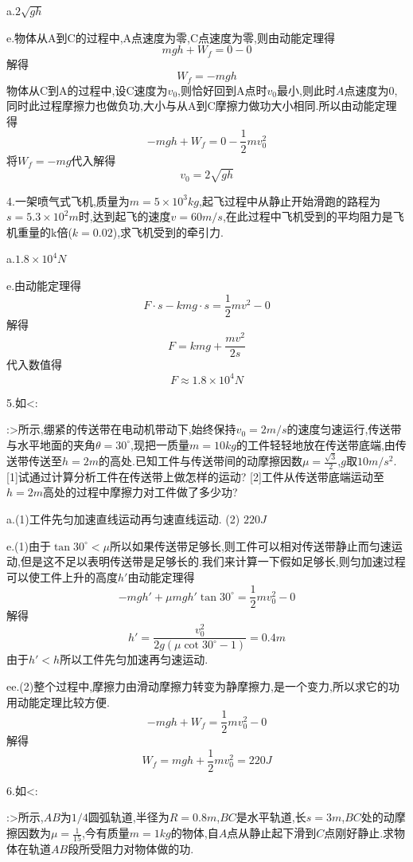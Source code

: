 \begin{calculate}
a.$2\sqrt{gh}$

e.物体从A到C的过程中,A点速度为零,C点速度为零,则由动能定理得
\[
  mgh+W_f=0-0
\]
解得
\[
  W_f=-mgh
\]
物体从C到A的过程中,设C速度为$v_0$,则恰好回到A点时$v_0$最小,则此时$A$点速度为0,同时此过程摩擦力也做负功,大小与从A到C摩擦力做功大小相同.所以由动能定理得
\[
  -mgh+W_f=0-\frac{1}{2}mv_0^2
\]
将$W_f=-mg$代入解得
\[
  v_0=2\sqrt{gh}
\]

4.一架喷气式飞机,质量为$m=5\times10^3kg$,起飞过程中从静止开始滑跑的路程为$s=5.3\times10^2m$时,达到起飞的速度$v=60m/s$,在此过程中飞机受到的平均阻力是飞机重量的k倍($k=0.02$),求飞机受到的牵引力.

a.$1.8\times10^4N$

e.由动能定理得
\[
  F\cdot s-kmg\cdot s=\frac{1}{2}mv^2-0
\]
解得
\[
  F=kmg+\frac{mv^2}{2s}
\]
代入数值得
\[
  F\approx1.8\times10^4N
\]

5.如<:
:>所示,绷紧的传送带在电动机带动下,始终保持$v_0=2m/s$的速度匀速运行,传送带与水平地面的夹角$\theta=30^\circ$,现把一质量$m=10kg$的工件轻轻地放在传送带底端,由传送带传送至$h=2m$的高处.已知工件与传送带间的动摩擦因数$\mu=\frac{\sqrt{3}}{2}$,$g$取$10m/s^2$.
[1]试通过计算分析工件在传送带上做怎样的运动?
[2]工件从传送带底端运动至$h=2m$高处的过程中摩擦力对工件做了多少功?

a.(1)工件先匀加速直线运动再匀速直线运动. \qquad (2) $220J$

e.(1)由于$\tan30^\circ<\mu$所以如果传送带足够长,则工件可以相对传送带静止而匀速运动,但是这不足以表明传送带是足够长的.我们来计算一下假如足够长,则匀加速过程可以使工件上升的高度$h'$由动能定理得
\[
  -mgh'+\mu mgh'\tan30^\circ =\frac{1}{2}mv_0^2-0
\]
解得
\[
  h'=\frac{v_0^2}{2g(\mu\cot30^\circ -1)}=0.4m
\]
由于$h'<h$所以工件先匀加速再匀速运动.

ee.(2)整个过程中,摩擦力由滑动摩擦力转变为静摩擦力,是一个变力,所以求它的功用动能定理比较方便.
\[
  -mgh+W_f=\frac{1}{2}mv_0^2-0
\]
解得
\[
  W_f=mgh+\frac{1}{2}mv_0^2=220J
\]

6.如<:
:>所示,$AB$为$1/4$圆弧轨道,半径为$R=0.8m$,$BC$是水平轨道,长$s=3m$,$BC$处的动摩擦因数为$\mu=\frac{1}{15}$,今有质量$m=1kg$的物体,自$A$点从静止起下滑到$C$点刚好静止.求物体在轨道$AB$段所受阻力对物体做的功.


\end{calculate}
